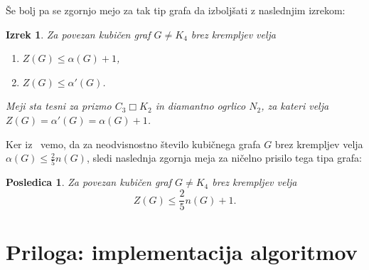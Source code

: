 \documentclass[12pt,a4paper,twoside]{article}
\theoremstyle{definition} %
\theoremstyle{plain} %
\newtheorem{izrek}[definicija]{Izrek}
\newtheorem{posledica}[definicija]{Posledica}
\numberwithin{equation}{section}  %
\DeclareMathOperator{\boxempty}{\Box}
\begin{document}
Še bolj pa se zgornjo mejo za tak tip grafa da izboljšati z naslednjim izrekom:
\begin{izrek}{{\cite[izrek 5]{davila2018claw}}}
    Za povezan kubičen graf $G \neq K_4$ brez krempljev velja
    \begin{enumerate}
        \item $Z(G) \leq \alpha(G) + 1$,
        \item $Z(G) \leq \alpha'(G)$.
    \end{enumerate}
    Meji sta tesni za prizmo $C_3 \boxempty K_2$ in diamantno ogrlico $N_2$, za kateri velja $Z(G) = \alpha'(G) = \alpha(G) + 1$.
\end{izrek}

Ker iz~\cite{faudree1992independent} vemo, da za neodvisnostno število kubičnega grafa $G$ brez krempljev velja $\alpha(G) \leq \frac{2}{5} n(G)$, sledi naslednja zgornja meja za ničelno prisilo tega tipa grafa:
\begin{posledica}
    Za povezan kubičen graf $G \neq K_4$ brez krempljev velja
    \[ Z(G) \leq \frac{2}{5} n(G) + 1. \]
\end{posledica}

\cleardoublepage                           %

\newpage

\appendix

\section{Priloga: implementacija algoritmov}

\inputminted[lastline=93]{c++}{koda/check.cpp}

\inputminted{c++}{koda/WhiteNeighbours.hpp}
\inputminted{c++}{koda/WhiteNeighbours.cpp}
\end{document}
